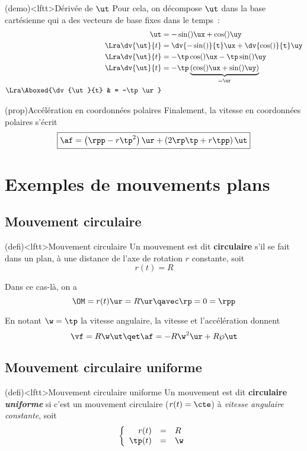 \documentclass[../../main/main.tex]{subfiles}
\begin{document}
\begin{tcb*}(demo)<lftt>{Dérivée de $\protect\ut$}
	Pour cela, on décompose $\ut$ dans la base cartésienne qui a des
	vecteurs de base fixes dans le temps~:
	\begin{align*}
		\ut                 & = -\sin(\tt)\ux + \cos(\tt)\uy
		\\\Lra
		\dv{\ut}{t}         & = \dv{-\sin(\tt)}{t}\ux + \dv{\cos(\tt)}{t}\uy
		\\\Lra
		\dv{\ut}{t}         & = -\tp\cos(\tt)\ux - \tp\sin(\tt)\uy
		\\\Lra
		\dv{\ut}{t}         & = -\tp
		\underbrace{\left(\cos(\tt)\ux + \sin(\tt)\uy\right)}_{= \ur}
		\\\Lra
		\Aboxed{\dv{\ut}{t} & = -\tp\ur}
	\end{align*}
\end{tcb*}


\begin{tcb*}(prop){Accélération en coordonnées polaires}
	Finalement, la vitesse en coordonnées polaires s'écrit
	\[\boxed{\af = \left( \rpp -r\tp^2 \right)\ur + \left( 2\rp\tp+r\tpp
			\right)\ut}\]
\end{tcb*}

\section{Exemples de mouvements plans}
\subsection{Mouvement circulaire}

\begin{tcb*}(defi)<lftt>{Mouvement circulaire}
	Un mouvement est dit \textbf{circulaire} s'il se fait dans un plan, à une
	distance de l'axe de rotation $r$ constante, soit
	\[
		r(t) = R
	\]
\end{tcb*}

Dans ce cas-là, on a
\[
	\OM = r(t)\ur = R\ur
	\qavec
	\rp = 0 = \rpp
\]

En notant $\w = \tp$ la vitesse angulaire, la vitesse et l'accélération donnent
\[
	\vf = R\w\ut
	\qet
	\af = -R\w^2\ur + R\wp\ut
\]

\subsection{Mouvement circulaire uniforme}
\begin{tcb*}(defi)<lftt>{Mouvement circulaire uniforme}
	Un mouvement est dit \textbf{circulaire \textit{uniforme}} si c'est un
	mouvement circulaire ($r(t) = \cte$) à \textit{vitesse angulaire
		constante}, soit
	\[
		\left\{
		\begin{array}{rcl}
			r(t)   & = & R  \\
			\tp(t) & = & \w
		\end{array}
		\right.
	\]
\end{tcb*}
\end{document}
